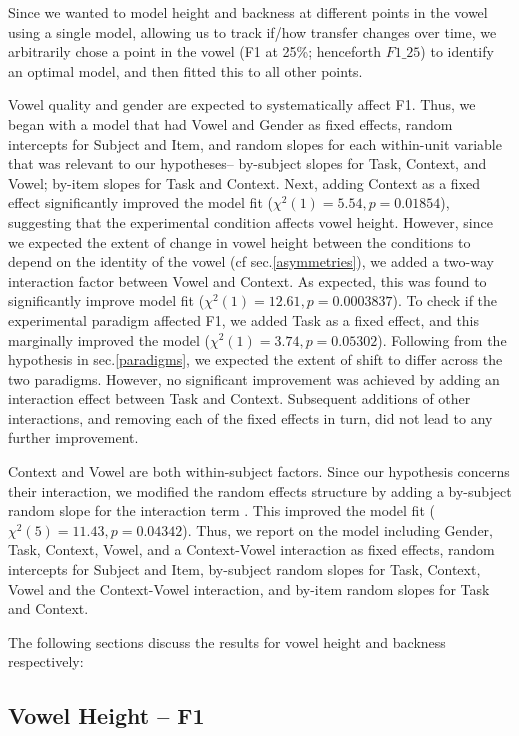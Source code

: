 \documentclass[charis,linguex]{glossa}
\begin{document}
Since we wanted to model height and backness at different points in the vowel using a single model, allowing us to track if/how transfer changes over time, we arbitrarily chose a point in the vowel (F1 at 25\%; henceforth $F1\_25$) to identify an optimal model, and then fitted this to all other points. 

Vowel quality and gender are expected to systematically affect F1. Thus, we began with a model that had Vowel and Gender as fixed effects, random intercepts for Subject and Item, and random slopes for each within-unit variable that was relevant to our hypotheses-- by-subject slopes for Task, Context, and Vowel; by-item slopes for Task and Context. Next, adding Context as a fixed effect significantly improved the model fit ($\chi^2(1) = 5.54, p= 0.01854$), suggesting that the experimental condition affects vowel height. However, since we expected the extent of change in vowel height between the conditions to depend on the identity of the vowel (cf sec.\ref{asymmetries}), we added a two-way interaction factor between Vowel and Context. As expected, this was found to significantly improve model fit ($\chi^2(1) = 12.61, p= 0.0003837$). To check if the experimental paradigm affected F1, we added Task as a fixed effect, and this marginally improved the model ($\chi^2(1) = 3.74, p= 0.05302$). Following from the hypothesis in sec.\ref{paradigms}, we expected the extent of shift to differ across the two paradigms. However, no significant improvement was achieved by adding an interaction effect between Task and Context. Subsequent additions of other interactions, and removing each of the fixed effects in turn, did not lead to any further improvement. 

Context and Vowel are both within-subject factors. Since our hypothesis concerns their interaction, we modified the random effects structure by adding a by-subject random slope for the interaction term \citep{brauer2018linear}. This improved the model fit ($\chi^2(5) = 11.43, p = 0.04342$). Thus, we report on the model including Gender, Task, Context, Vowel, and a Context-Vowel interaction as fixed effects, random intercepts for Subject and Item, by-subject random slopes for Task, Context, Vowel and the Context-Vowel interaction, and by-item random slopes for Task and Context.

The following sections discuss the results for vowel height and backness respectively:

\subsection{Vowel Height -- F1}
\end{document}

